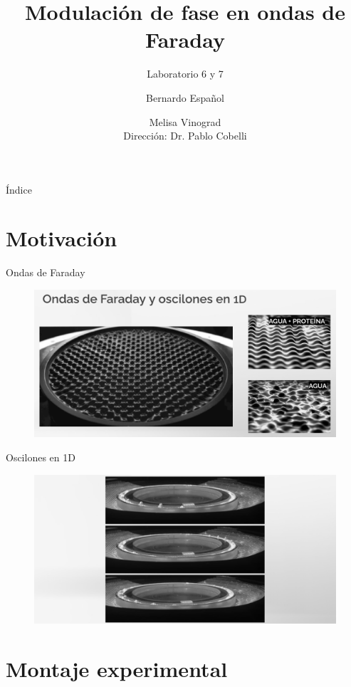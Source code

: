 \documentclass[aspectratio=169]{beamer}
\title{Modulación de fase en ondas de Faraday}
\subtitle{Laboratorio 6 y 7}
\author{
	Bernardo Español \and Melisa Vinograd
	\texorpdfstring{\\ \vspace{0.1cm} Dirección: Dr. Pablo Cobelli}{}
}
\institute{Laboratorio de Turbulencia Geofísica, FLiP: Fluidos y Plasmas}
\date{}
\begin{document}
\begin{frame}
	\titlepage
\end{frame}

\begin{frame}{Índice}
	\tableofcontents
\end{frame}


\section{Motivación}

\begin{frame}{Ondas de Faraday} %
	\begin{figure}[ht]
		\centering
		\includegraphics[width=1\textwidth]{figs/ss1.png}
	\end{figure}
\end{frame}

\begin{frame}{Oscilones en 1D} %
	\begin{figure}[ht]
		\centering
		\includegraphics[width=1\textwidth]{figs/ss3.png}
	\end{figure}
\end{frame}

\section{Montaje experimental}
\end{document}
